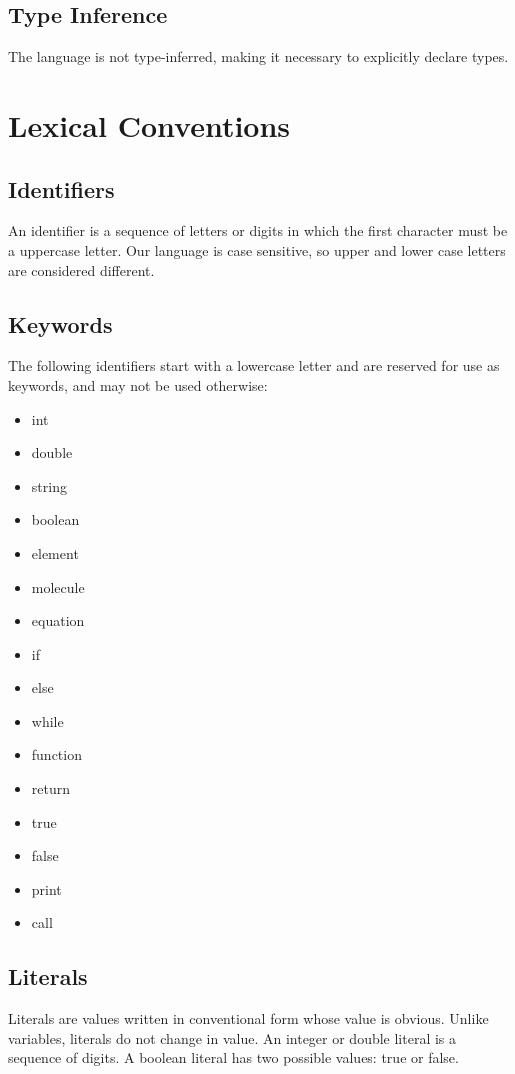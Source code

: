 \documentclass[11pt]{report}
\begin{document}
\subsection{Type Inference}
The language is not type-inferred, making it necessary to explicitly declare types.

\section{Lexical Conventions}
\subsection{Identifiers}
An identifier is a sequence of letters or digits in which the first character must be a uppercase letter. Our language is case sensitive, so upper and lower case letters are considered different.

\subsection{Keywords}
The following identifiers start with a lowercase letter and are reserved for use as keywords, and may not be used otherwise:
\begin{multicols}{3}
 \begin{itemize}
 \item int
 \item double
 \item string
 \item boolean
 \item element
 \item molecule
 \item equation
 \item if
 \item else
 \item while
 \item function
 \item return
 \item true
 \item false
 \item print
 \item call
 \end{itemize}
\end{multicols}

\subsection{Literals}
Literals are values written in conventional form whose value is obvious. Unlike variables, literals do not change in value. An integer or double literal is a sequence of digits. A boolean literal has two possible values: true or false.
\end{document}
